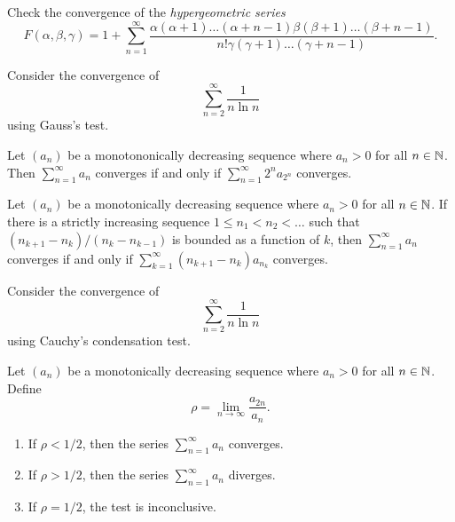 \begin{example}
  Check the convergence of the \textit{hypergeometric series}
  \[ F(\alpha, \beta, \gamma) = 1 + \sum_{n = 1}^{\infty}
    \frac{\alpha (\alpha + 1) \dots (\alpha + n - 1) \beta (\beta + 1)
  \dots (\beta + n - 1)}{n! \gamma (\gamma + 1) \dots (\gamma + n - 1)}. \]
\end{example}

\begin{example}
  Consider the convergence of
  \[ \sum_{n = 2}^{\infty} \frac{1}{n \ln n} \]
  using Gauss's test.
\end{example}

\begin{proposition}
  Let $(a_n)$ be a monotononically decreasing sequence where $a_n
  > 0$ for all $n \in \mathbb N$. Then $\sum_{n = 1}^{\infty} a_n$
  converges if and only if $\sum_{n = 1}^{\infty} 2^n a_{2^n}$ converges.
\end{proposition}

\begin{proposition}
  Let $(a_n)$ be a monotonically decreasing sequence where $a_n >
  0$ for all $n \in \mathbb N$. If there is a strictly increasing sequence
  $1 \leq n_1 < n_2 < \dots$ such that $(n_{k + 1} - n_k) / (n_{k} -
  n_{k - 1})$ is bounded as a function of $k$, then $\sum_{n =
  1}^{\infty} a_n$ converges if and only if $\sum_{k = 1}^{\infty}
  (n_{k + 1} - n_k) a_{n_k}$ converges.
\end{proposition}

\begin{example}
  Consider the convergence of
  \[ \sum_{n = 2}^{\infty} \frac{1}{n \ln n} \]
  using Cauchy's condensation test.
\end{example}

\begin{proposition}
  Let $(a_n)$ be a monotonically decreasing sequence where $a_n > 0$
  for all $n \in \mathbb N$. Define
  \[ \rho = \lim_{n \to \infty} \frac{a_{2n}}{a_n}. \]
  \begin{enumerate}
    \item If $\rho < 1/2$, then the series $\sum_{n = 1}^{\infty}
      a_n$ converges.
    \item If $\rho > 1/2$, then the series $\sum_{n = 1}^{\infty} a_n$ diverges.
    \item If $\rho = 1/2$, the test is inconclusive.
  \end{enumerate}
\end{proposition}

